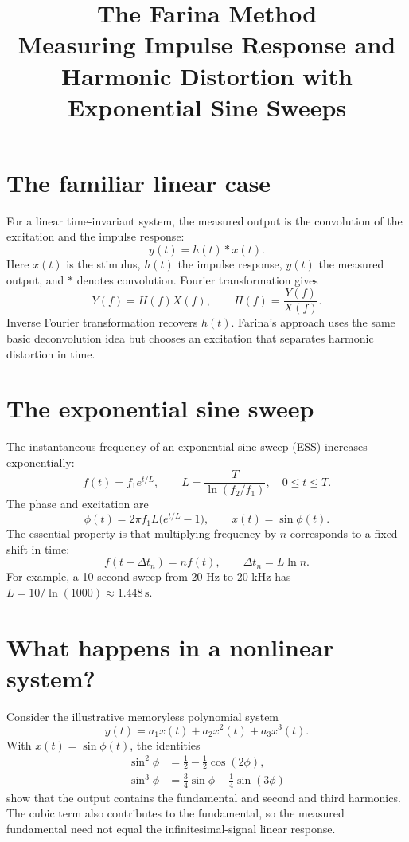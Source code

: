 \documentclass[11pt,a4paper]{article}
\title{The Farina Method\\\large Measuring Impulse Response and Harmonic Distortion with Exponential Sine Sweeps}
\author{}
\date{}
\begin{document}
\maketitle
\section{The familiar linear case}
For a linear time-invariant system, the measured output is the convolution of the excitation and the impulse response:
\begin{equation}y(t)=h(t)*x(t).\end{equation}
Here $x(t)$ is the stimulus, $h(t)$ the impulse response, $y(t)$ the measured output, and $*$ denotes convolution. Fourier transformation gives
\begin{equation}Y(f)=H(f)X(f),\qquad H(f)=\frac{Y(f)}{X(f)}.\end{equation}
Inverse Fourier transformation recovers $h(t)$. Farina's approach uses the same basic deconvolution idea but chooses an excitation that separates harmonic distortion in time.

\section{The exponential sine sweep}
The instantaneous frequency of an exponential sine sweep (ESS) increases exponentially:
\begin{equation}f(t)=f_1e^{t/L},\qquad L=\frac{T}{\ln(f_2/f_1)},\quad 0\le t\le T.\end{equation}
The phase and excitation are
\begin{equation}\phi(t)=2\pi f_1L\bigl(e^{t/L}-1\bigr),\qquad x(t)=\sin\phi(t).\end{equation}
The essential property is that multiplying frequency by $n$ corresponds to a fixed shift in time:
\begin{equation}\boxed{f(t+\Delta t_n)=nf(t),\qquad \Delta t_n=L\ln n.}\end{equation}
For example, a 10-second sweep from 20 Hz to 20 kHz has $L=10/\ln(1000)\approx1.448\,\mathrm{s}$.

\section{What happens in a nonlinear system?}
Consider the illustrative memoryless polynomial system
\begin{equation}y(t)=a_1x(t)+a_2x^2(t)+a_3x^3(t).\end{equation}
With $x(t)=\sin\phi(t)$, the identities
\begin{align}\sin^2\phi&=\tfrac12-\tfrac12\cos(2\phi),\\
\sin^3\phi&=\tfrac34\sin\phi-\tfrac14\sin(3\phi)
\end{align}
show that the output contains the fundamental and second and third harmonics. The cubic term also contributes to the fundamental, so the measured fundamental need not equal the infinitesimal-signal linear response.
\end{document}
